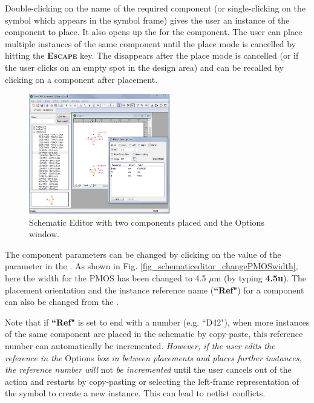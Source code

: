 
Double-clicking on the name of the required component (or single-clicking on the symbol which appears in the symbol frame) gives the user an instance of the component to place.   It also opens up the  for the component.   The user can place multiple instances of the same component until the place mode is cancelled by hitting the \textsf{\textbf{\textsc{Escape}}} key.  The  disappears after the place mode is cancelled (or if the user clicks on an empty spot in the design area) and can be recalled by clicking on a component after placement.

\begin{figure}
    \includegraphics[width=0.55\textwidth]{./figures/getting_started_figures/CoolSPICE_SchematicEditorwithDevicesandOptions.png}
	\caption{{Schematic Editor with two components placed and the \textsf{Options} window.}}
  \label{fig_schematiceditor_devicesandoptions}
\end{figure}

%
  The component parameters can be changed by clicking on the value of the parameter in the .  As shown in Fig. \ref{fig_schematiceditor_changePMOSwidth}, here the width for the PMOS has been changed to 4.5 $\mu$m (by typing {\bf{\textsf{4.5u}}}).  The placement orientation and the instance reference name (\textbf{``Ref"}) for a component can also be changed from the .  

Note that if \textbf{``Ref"} is set to end with a number (e.g. ``D42"), when more instances of the same component are placed in the schematic by copy-paste, this reference number can automatically be incremented.  \emph{However, if the user edits the reference in the} {\textsf{Options}} \emph{box in between placements and places further instances, the reference number will} not \emph{be incremented} until the user cancels out of the action and restarts by copy-pasting or selecting the left-frame representation of the symbol to create a new instance.  This can lead to netlist conflicts. 

